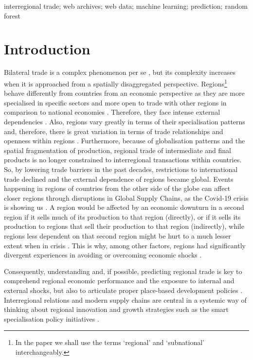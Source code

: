 \documentclass[]{interact}
\theoremstyle{plain}%
\theoremstyle{definition}
\theoremstyle{remark}
\begin{document}
\begin{keywords}
interregional trade; web archives; web data; machine learning;
prediction; random forest
\end{keywords}

\hypertarget{sec:1}{%
\section{Introduction}\label{sec:1}}

Bilateral trade is a complex phenomenon per se \citep{topology_trade},
but its complexity increases when it is approached from a spatially
disaggregated perspective. Regions\footnote{In the paper we shall use
  the terms `regional' and `subnational' interchangeably.} behave
differently from countries from an economic perspective as they are more
specialised in specific sectors and more open to trade with other
regions in comparison to national economies
\citep{isard1951interregional, miller2009input}. Therefore, they face
intense external dependencies \citep{matter2009economic}. Also, regions
vary greatly in terms of their specialisation patterns and, therefore,
there is great variation in terms of trade relationships and openness
within regions \citep{fingleton2012recessionary}. Furthermore, because
of globalisation patterns and the spatial fragmentation of production,
regional trade of intermediate and final products is no longer
constrained to interregional transactions within countries. So, by
lowering trade barriers in the past decades, restrictions to
international trade declined and the external dependence of regions
became global. Events happening in regions of countries from the other
side of the globe can affect closer regions through disruptions in
Global Supply Chains, as the Covid-19 crisis is showing us
\citep{guan2020global, david2013china}. A region would be affected by an
economic downturn in a second region if it sells much of its production
to that region (directly), or if it sells its production to regions that
sell their production to that region (indirectly), while regions less
dependent on that second region might be hurt to a much lesser extent
when in crisis \citep{thissen2016competitive}. This is why, among other
factors, regions had significantly divergent experiences in avoiding or
overcoming economic shocks \citep{kitsos2019role}.

Consequently, understanding and, if possible, predicting regional trade
is key to comprehend regional economic performance and the exposure to
internal and external shocks, but also to articulate proper place-based
development policies \citep{barca2009agenda}. Interregional relations
and modern supply chains are central in a systemic way of thinking about
regional innovation and growth strategies \citep{thissen2013integrated}
such as the smart specialisation policy initiatives
\citep{mccann2015smart}.
\end{document}
